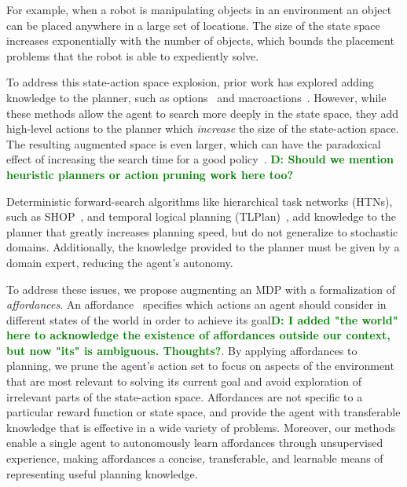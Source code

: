 \documentclass[conference]{IEEEtran}
\newcommand{\dnote}[1]{\textcolor{Green}{\textbf{D: #1}}}
\begin{document}
For example, when a robot is manipulating objects in an environment
an object can be placed anywhere in a large set of locations. The size
of the state space increases exponentially with the number of objects,
which bounds the placement problems that the robot is able to expediently solve.

To address this state-action space explosion, prior work has explored adding knowledge to the planner,
such as options~\cite{sutton99} and macroactions~\cite{Botea:2005kx,Newton:2005vn}. 
However, while these methods allow the agent to search more deeply in the state
space, they add high-level actions to the planner which {\em increase} the size of the state-action space.
The resulting augmented space is even larger, which can have
the paradoxical effect of increasing the search time for a good
policy~\cite{Jong:2008zr}.
\dnote{Should we mention heuristic planners or action pruning work here too?}

Deterministic forward-search algorithms like hierarchical task networks (HTNs),
such as SHOP~\citep{Nau:1999:SSH:1624312.1624357}, and
temporal logical planning (TLPlan)~\citep{Bacchus95usingtemporal,Bacchus99usingtemporal}, add
knowledge to the planner that greatly increases planning speed, but do not
generalize to stochastic domains. Additionally, the knowledge provided to the planner must be given by a domain expert,
reducing the agent's autonomy.

To address these issues, we propose augmenting an MDP
with a formalization of {\em affordances}. An
affordance~\cite{gibson77} specifies which actions an agent should consider in
different states of the world in order to achieve its goal\dnote{I added "the world" here to acknowledge
the existence of affordances outside our context, but now "its" is ambiguous. Thoughts?}.
By applying affordances to planning, we prune the agent's action set to
focus on aspects of the environment that
are most relevant to solving its current goal and avoid
exploration of irrelevant parts of the state-action space.
Affordances are not specific to a particular reward
function or state space, and provide the agent with transferable
knowledge that is effective in a wide variety of problems. Moreover, 
our methods enable a single agent to autonomously learn affordances
through unsupervised experience, making affordances a concise, transferable, and
learnable means of representing useful planning knowledge.

\end{document}
